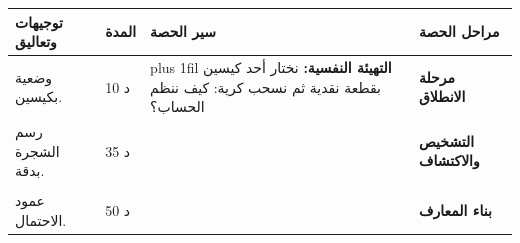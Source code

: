 \documentclass[12pt,a4paper]{article}
\newenvironment{LTR}{\begin{otherlanguage}{english}}{\end{otherlanguage}}
\newcommand{\ar}[1]{\foreignlanguage{arabic}{#1}}
\newcommand{\Phase}[1]{\textbf{#1}}
\newenvironment{Sayr}{%
\begin{LTR}\renewcommand{\arraystretch}{1.25}\setlength{\tabcolsep}{4pt}\relpenalty=10000\binoppenalty=10000\tolerance=9000\emergencystretch=0.3\linewidth
\begin{longtable}{|p{0.09\textwidth}|>{\centering\arraybackslash}p{0.05\textwidth}|p{0.71\textwidth}|>{\centering\arraybackslash}p{0.09\textwidth}|}
\hline\rowcolor{cThm!12}\ar{\footnotesize\textbf{توجيهات وتعاليق}} & \ar{\footnotesize\textbf{المدة}} & \ar{\textbf{سير الحصة}} & \ar{\footnotesize\textbf{مراحل الحصة}}\\\hline\endhead
\hline\endfoot}{\end{longtable}\end{LTR}}
\newcommand{\RaggedEnd}{\leftskip=0pt plus 1fil\relax}
\newcommand{\Row}[4]{\ar{\small #4} & \ar{#3} & \ar{\RaggedEnd #2} & \cellcolor{cThm!8}\ar{\Phase{#1}}\\\hline}
\newcommand{\Lab}[2]{\foreignlanguage{english}{\tcbox[on line,colback=#1,colframe=#1,boxrule=0pt,arc=2pt,boxsep=1pt,left=5pt,right=5pt,top=1pt,bottom=1pt]{\ar{\textcolor{white}{\textbf{#2}}}}}}
\newcommand{\RR}[1]{\ifmmode{\color{cThm}#1}\else$\mbox{\color{cThm}#1}$\fi}
\providecommand{\LW}[1]{{\color{cDef}#1}}
\begin{document}
\begin{Sayr}
\Row{مرحلة الانطلاق}{%
\textbf{التهيئة النفسية:} نختار أحد كيسين بقطعة نقدية ثم نسحب كرية: كيف ننظم الحساب؟}{10 د}{وضعية بكيسين.}
\Row{التشخيص والاكتشاف}{%
\Lab{cEx}{نشاط رقم 09}\ $U_1$: $3$ حمراء و $2$ خضراوان ؛ $U_2$: حمراء واحدة و $4$ خضراء. نختار كيسًا بقطعة نقدية ثم نسحب كرية. $R$: «حمراء» ، $V$: «خضراء».\par\textbf{(1)} مثّل التجربة بشجرة احتمالات.\par\textbf{(2)} احسب $P(U_1\cap R)$ و $P(U_2\cap R)$ ، ثم $P(R)$.}{35 د}{رسم الشجرة بدقة.}
\Row{}{%
\Lab{cDef}{مناقشة النشاط}\par\textbf{(1)} مرحلتان: اختيار الكيس ثم السحب ؛ على كل فرع الاحتمال (الشرطي):\par\smallskip\begin{LTR}\centering \begin{tikzpicture}[font=\small,ev/.style={rounded corners=2pt,fill=cDef!12,draw=cDef,inner sep=2pt,minimum size=6mm},br/.style={draw=cDef!70,thick}]\coordinate (O) at (0,0); \fill[cDef] (O) circle (1.8pt);\node[ev] (F0) at (3.2,1.4){$U_1$};\draw[br] (O)--(F0) node[midway,above,sloped]{$\frac12$};\node[ev] (L00) at (6.4,2.1){$R$};\draw[br] (F0)--(L00) node[midway,above,sloped]{$\frac35$};\node[anchor=west] at (7,2.1){$\frac12\times\frac35=\frac3{10}$};\node[ev] (L01) at (6.4,0.7){$V$};\draw[br] (F0)--(L01) node[midway,below,sloped]{$\frac25$};\node[anchor=west] at (7,0.7){$\frac12\times\frac25=\frac15$};\node[ev] (F1) at (3.2,-1.4){$U_2$};\draw[br] (O)--(F1) node[midway,below,sloped]{$\frac12$};\node[ev] (L10) at (6.4,-0.7){$R$};\draw[br] (F1)--(L10) node[midway,above,sloped]{$\frac15$};\node[anchor=west] at (7,-0.7){$\frac12\times\frac15=\frac1{10}$};\node[ev] (L11) at (6.4,-2.1){$V$};\draw[br] (F1)--(L11) node[midway,below,sloped]{$\frac45$};\node[anchor=west] at (7,-2.1){$\frac12\times\frac45=\frac25$};\node[anchor=west,font=\small\bfseries] at (7,3){\ar{الاحتمال}};\end{tikzpicture}\end{LTR}\par \par\textbf{(2)} $P(U_1\cap R)=\dfrac12\times\dfrac35=\RR{\dfrac3{10}}$ ؛ \quad $P(U_2\cap R)=\dfrac12\times\dfrac15=\RR{\dfrac1{10}}$.\par\textbf{(3)} $P(R)=\dfrac3{10}+\dfrac1{10}=\RR{\dfrac25}$.}{}{}
\Row{بناء المعارف}{%
\Lab{cMeth}{شجرة الاحتمالات}\par\textbf{(1)} مجموع احتمالات الفروع الخارجة من عقدة يساوي $\LW{1}$.\par\textbf{(2)} احتمال مسار = \RR{جداء} \RR{احتمالات} \RR{فروعه} ؛ مجموع عمود «الاحتمال» يساوي $\LW{1}$.}{50 د}{عمود الاحتمال.}

\end{Sayr}
\end{document}
